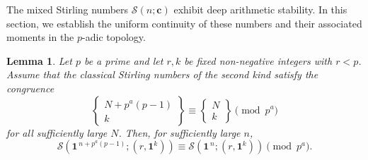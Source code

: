 \documentclass[12pt]{amsart}
\newtheorem{lemma}[theorem]{Lemma}
\theoremstyle{definition}
\begin{document}
The mixed Stirling numbers $\mathcal{S}(n; \mathbf{c})$ exhibit deep arithmetic stability. In this section, we establish the uniform continuity of these numbers and their associated moments in the $p$-adic topology.
\begin{lemma}
\label{lem:mixed_kummer}
Let $p$ be a prime and let $r,k$ be fixed non-negative integers with $r<p$. Assume that the classical Stirling numbers of the second kind satisfy the congruence
\[
\left\{\begin{matrix}
N+p^a(p-1)\\ k
\end{matrix}\right\}
\equiv
\left\{\begin{matrix}
N\\ k
\end{matrix}\right\}
\pmod {p^a}
\]
for all sufficiently large $N$. Then, for sufficiently large $n$,
\begin{equation}
\mathcal{S}
(\mathbf{1}^{\,n+p^a(p-1)};
(r,\mathbf{1}^{k}))
\equiv
\mathcal{S}
(\mathbf{1}^{\,n};
(r,\mathbf{1}^{k}))
\pmod {p^a}.
\end{equation}
\end{lemma}
\end{document}
